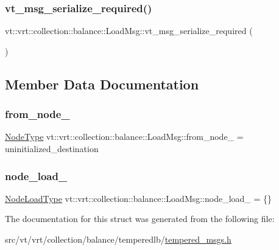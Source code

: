 \subsubsection{\texorpdfstring{vt\+\_\+msg\+\_\+serialize\+\_\+required()}{vt\_msg\_serialize\_required()}}
{\footnotesize\ttfamily vt\+::vrt\+::collection\+::balance\+::\+Load\+Msg\+::vt\+\_\+msg\+\_\+serialize\+\_\+required (\begin{DoxyParamCaption}{ }\end{DoxyParamCaption})}



\subsection{Member Data Documentation}
\mbox{\label{structvt_1_1vrt_1_1collection_1_1balance_1_1_load_msg_a0f4e4ee3be0ec523e6bebe15ddcd3459}} 
\subsubsection{\texorpdfstring{from\+\_\+node\+\_\+}{from\_node\_}}
{\footnotesize\ttfamily \hyperlink{namespacevt_a866da9d0efc19c0a1ce79e9e492f47e2}{Node\+Type} vt\+::vrt\+::collection\+::balance\+::\+Load\+Msg\+::from\+\_\+node\+\_\+ = uninitialized\+\_\+destination\hspace{0.3cm}{\ttfamily [private]}}

\mbox{\label{structvt_1_1vrt_1_1collection_1_1balance_1_1_load_msg_afdbf7d2d139d40c8e04958d2c02bb94d}} 
\subsubsection{\texorpdfstring{node\+\_\+load\+\_\+}{node\_load\_}}
{\footnotesize\ttfamily \hyperlink{structvt_1_1vrt_1_1collection_1_1balance_1_1_load_msg_a573cc4f6cf58c3160e94a6351a3912d2}{Node\+Load\+Type} vt\+::vrt\+::collection\+::balance\+::\+Load\+Msg\+::node\+\_\+load\+\_\+ = \{\}\hspace{0.3cm}{\ttfamily [private]}}



The documentation for this struct was generated from the following file\+:\begin{DoxyCompactItemize}
\item 
src/vt/vrt/collection/balance/temperedlb/\hyperlink{tempered__msgs_8h}{tempered\+\_\+msgs.\+h}\end{DoxyCompactItemize}

